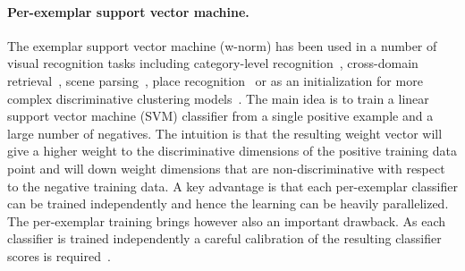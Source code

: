 
\paragraph{Per-exemplar support vector machine.} 
    The exemplar support vector machine (w-norm) has been used in a number of visual recognition tasks including
    category-level recognition~\cite{Malisiewicz11}, cross-domain retrieval~\cite{Shrivastava11}, scene parsing~\cite{Tighe13}, %
    place recognition~\cite{Gronat13} or as an initialization  for more complex discriminative clustering models~\cite{Doersch12,Singh12}. The main idea is to train a linear support vector machine (SVM) classifier from a single positive example and a large number of negatives. The intuition is that the resulting weight vector will give a higher weight to the discriminative dimensions of the positive training data point and will down weight dimensions that are non-discriminative with respect to the negative training data. A key advantage is that each per-exemplar classifier can be trained independently and hence the learning can be heavily parallelized. 
    The per-exemplar training brings however also an important drawback. As each classifier is trained independently a
    careful calibration of the resulting classifier scores is required~\cite{Malisiewicz11}. 

